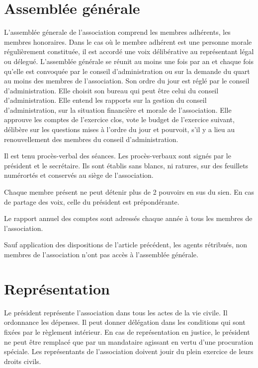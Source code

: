 \documentclass[a4paper,defaultorg]{organisation-contract}
\begin{document}
\section{Assemblée générale}

L'assemblée génerale de l'association comprend les membres adhérents, les
membres honoraires. Dans le cas où le membre adhérent est une personne morale
régulièrement constituée, il est accordé une voix délibérative au représentant
légal ou délegué.
L'assemblée générale se réunit au moins une fois par an et chaque fois qu'elle
est convoquée par le conseil d'administration ou sur la demande du quart au
moins des membres de l'association.
Son ordre du jour est réglé par le conseil d'administration. Elle choisit son
bureau qui peut être celui du conseil d'administration. Elle entend les rapports
sur la gestion du conseil d'administration, sur la situation financière et
morale de l'association. Elle approuve les comptes de l'exercice clos, vote le
budget de l'exercice suivant, délibère sur les questions mises à l'ordre du jour
et pourvoit, s'il y a lieu au renouvellement des membres du conseil
d'administration.

Il est tenu procès-verbal des séances. Les procès-verbaux sont signés par le
président et le secrétaire. Ils sont établis sans blancs, ni ratures, sur des
feuillets numérortés et conservés au siège de l'association.

Chaque membre présent ne peut détenir plus de 2 pouvoirs en sus du sien. En cas
de partage des voix, celle du président est prépondérante.

Le rapport annuel des comptes sont adressés chaque année à tous les membres de
l'association.

Sauf application des dispositions de l'article précédent, les agents rétribués,
non membres de l'association n'ont pas accès à l'assemblée générale.

\section{Représentation}
Le président représente  l'association dans tous les actes de la vie civile. Il
ordonnance les dépenses. Il peut donner délégation dans les conditions qui sont
fixées par le règlement intérieur.
En cas de représentation en justice, le président ne peut être remplacé que par
un mandataire agissant en vertu d'une procuration spéciale.
Les représentants de l'association doivent jouir du plein exercice de leurs
droits civils.
\end{document}
